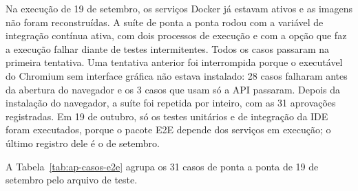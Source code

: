 Na execução de 19 de setembro, os serviços Docker já estavam ativos e as imagens não foram reconstruídas. A suíte de ponta a ponta rodou com a variável de integração contínua ativa, com dois processos de execução e com a opção que faz a execução falhar diante de testes intermitentes. Todos os casos passaram na primeira tentativa. Uma tentativa anterior foi interrompida porque o executável do Chromium sem interface gráfica não estava instalado: 28 casos falharam antes da abertura do navegador e os 3 casos que usam só a API passaram. Depois da instalação do navegador, a suíte foi repetida por inteiro, com as 31 aprovações registradas. Em 19 de outubro, só os testes unitários e de integração da IDE foram executados, porque o pacote E2E depende dos serviços em execução; o último registro dele é o de setembro.

A Tabela~\ref{tab:ap-casos-e2e} agrupa os 31 casos de ponta a ponta de 19 de setembro pelo arquivo de teste.

